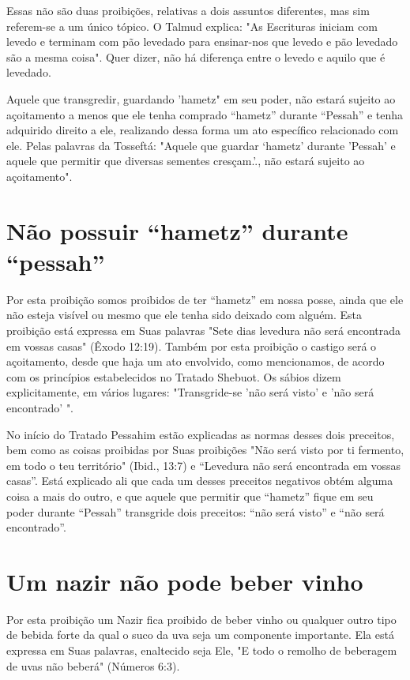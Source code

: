 Essas não são duas proibições, relativas a dois assuntos diferentes, mas
sim referem-se a um único tópico. O Talmud explica: "As Escrituras
ini­ciam com levedo e terminam com pão levedado para ensinar-nos que
levedo e pão levedado são a mesma coisa". Quer dizer, não há diferença
entre o leve­do e aquilo que é levedado.

Aquele que transgredir, guardando 'hametz" em seu poder, não es­tará
sujeito ao açoitamento a menos que ele tenha comprado ``hametz'' duran­te
``Pessah'' e tenha adquirido direito a ele, realizando dessa forma um ato
es­pecífico relacionado com ele. Pelas palavras da Tosseftá: "Aquele que
guardar `hametz' durante 'Pessah' e aquele que permitir que diversas
sementes cresçam.'., não estará
sujeito ao açoitamento".


\section{Não possuir ``hametz'' durante ``pessah''}

Por esta proibição somos proibidos de ter ``hametz'' em nossa pos­se,
ainda que ele não esteja visível ou mesmo que ele tenha sido deixado com
alguém. Esta proibição está expressa em Suas palavras "Sete dias
levedura não será encontrada em vossas casas" (Êxodo 12:19). Também por
esta proibição o castigo será o açoitamento, desde que haja um ato
envolvido, como mencio­namos, de acordo com os princípios estabelecidos
no Tratado Shebuot. Os sá­bios dizem explicitamente, em vários lugares:
"Transgride-se 'não será visto' e 'não será encontrado' ".

No início do Tratado Pessahim estão explicadas as normas desses dois
preceitos, bem como as coisas proibidas por Suas proibições "Não será
visto por ti fermento, em todo o teu território" (Ibid., 13:7) e
``Levedura não será encontrada em vossas casas''. Está explicado ali que
cada um desses preceitos negativos obtém alguma coisa a mais do outro, e
que aquele que permitir que ``hametz'' fique em seu poder durante ``Pessah''
transgride dois preceitos: ``não será visto'' e ``não será encontrado''.


\section{Um nazir não pode beber vinho}


Por esta proibição um Nazir fica proibido de beber vinho ou qual­quer
outro tipo de bebida forte da qual o suco da uva seja um componente
importante. Ela está expressa em Suas palavras, enaltecido seja Ele, "E
todo o remolho de beberagem de uvas não beberá" (Números 6:3).


